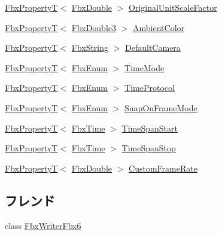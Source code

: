 \begin{DoxyCompactItemize}
\item 
\hyperlink{class_fbx_property_t}{Fbx\+PropertyT}$<$ \hyperlink{fbxtypes_8h_a171e72a1c46fc15c1a6c9c31948c1c5b}{Fbx\+Double} $>$ \hyperlink{class_fbx_global_settings_aacabbbe70923f27acded514e698ad399}{Original\+Unit\+Scale\+Factor}
\item 
\hyperlink{class_fbx_property_t}{Fbx\+PropertyT}$<$ \hyperlink{fbxtypes_8h_ae0a96f14cde566774c7553aa7523b7a7}{Fbx\+Double3} $>$ \hyperlink{class_fbx_global_settings_ae88d400ce323626f0293c03531c79975}{Ambient\+Color}
\item 
\hyperlink{class_fbx_property_t}{Fbx\+PropertyT}$<$ \hyperlink{class_fbx_string}{Fbx\+String} $>$ \hyperlink{class_fbx_global_settings_ae22135d96da50b31043a31bdf8815daf}{Default\+Camera}
\item 
\hyperlink{class_fbx_property_t}{Fbx\+PropertyT}$<$ \hyperlink{fbxtypes_8h_a9a28614cb4272a0ad7d748eda7f3d3e5}{Fbx\+Enum} $>$ \hyperlink{class_fbx_global_settings_a0bb2b74ae4ea617f08d00b368f5d7c8d}{Time\+Mode}
\item 
\hyperlink{class_fbx_property_t}{Fbx\+PropertyT}$<$ \hyperlink{fbxtypes_8h_a9a28614cb4272a0ad7d748eda7f3d3e5}{Fbx\+Enum} $>$ \hyperlink{class_fbx_global_settings_aa210c0c36889f764b53066082ca5452a}{Time\+Protocol}
\item 
\hyperlink{class_fbx_property_t}{Fbx\+PropertyT}$<$ \hyperlink{fbxtypes_8h_a9a28614cb4272a0ad7d748eda7f3d3e5}{Fbx\+Enum} $>$ \hyperlink{class_fbx_global_settings_aa698429b48e7e2c404a7a0ca8bdee18e}{Snap\+On\+Frame\+Mode}
\item 
\hyperlink{class_fbx_property_t}{Fbx\+PropertyT}$<$ \hyperlink{class_fbx_time}{Fbx\+Time} $>$ \hyperlink{class_fbx_global_settings_a58fe5bbda2ad6c833cec07c3ca158aba}{Time\+Span\+Start}
\item 
\hyperlink{class_fbx_property_t}{Fbx\+PropertyT}$<$ \hyperlink{class_fbx_time}{Fbx\+Time} $>$ \hyperlink{class_fbx_global_settings_a4f60466f7d9a757dcf3bf50d22701846}{Time\+Span\+Stop}
\item 
\hyperlink{class_fbx_property_t}{Fbx\+PropertyT}$<$ \hyperlink{fbxtypes_8h_a171e72a1c46fc15c1a6c9c31948c1c5b}{Fbx\+Double} $>$ \hyperlink{class_fbx_global_settings_a4d9660899e5c2a3bd45c962f062ffbe5}{Custom\+Frame\+Rate}
\end{DoxyCompactItemize}
\subsection*{フレンド}
\begin{DoxyCompactItemize}
\item 
class \hyperlink{class_fbx_global_settings_aac0b71d5f5893e5b1c45f6eba4e78b24}{Fbx\+Writer\+Fbx6}
\end{DoxyCompactItemize}
